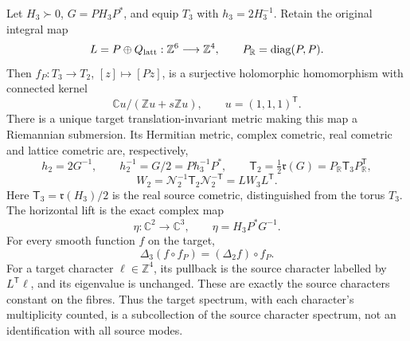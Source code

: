 \begin{theorem}
\label{q444:metric-submersion}
Let $H_3\succ0$, $G=PH_3P^*$, and equip $T_3$ with
$h_3=2H_3^{-1}$. Retain the original integral map
\[
 L=P\oplus Q_{\rm latt}:\mathbb Z^6\longrightarrow\mathbb Z^4,
 \qquad P_{\mathbb R}=\operatorname{diag}(P,P).
\]
Then $f_P:T_3\to T_2$, $[z]\mapsto[Pz]$, is a surjective holomorphic
homomorphism with connected kernel
\[
 \mathbb C u/(\mathbb Z u+s\mathbb Z u),\qquad
 u=(1,1,1)^{\mathsf T}.                                    \tag{HS.10}
\]
There is a unique target translation-invariant metric making this map
a Riemannian submersion. Its Hermitian metric, complex cometric, real
cometric and lattice cometric are, respectively,
\[
 h_2=2G^{-1},\qquad h_2^{-1}=G/2=Ph_3^{-1}P^*,\qquad
 \mathsf T_2=\tfrac12\mathfrak r(G)
       =P_{\mathbb R}\mathsf T_3P_{\mathbb R}^{\mathsf T},
                                                               \tag{HS.11}
\]
\[
 W_2=\mathcal N_2^{-1}\mathsf T_2\mathcal N_2^{-\mathsf T}
     =LW_3L^{\mathsf T}.                                    \tag{HS.12}
\]
Here $\mathsf T_3=\mathfrak r(H_3)/2$ is the real source cometric,
distinguished from the torus $T_3$. The horizontal lift is the exact complex map
\[
 \eta:\mathbb C^2\longrightarrow\mathbb C^3,\qquad
 \eta=H_3P^*G^{-1}.                                         \tag{HS.13}
\]
For every smooth function $f$ on the target,
\[
 \Delta_3(f\circ f_P)=(\Delta_2f)\circ f_P.                    \tag{HS.14}
\]
For a target character $\ell\in\mathbb Z^4$, its pullback is the source
character labelled by $L^{\mathsf T}\ell$, and its eigenvalue is unchanged.
These are exactly the source characters constant on the fibres. Thus
the target spectrum, with each character's multiplicity counted, is
a subcollection of the source character spectrum, not an identification
with all source modes.
\end{theorem}
